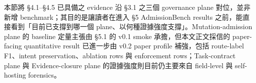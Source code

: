 \documentclass[a4paper,fontset=none]{ctexart}
\begin{document}
本節將 §4.1--§4.5 已具備之 evidence 沿 §3.1 之三個 governance plane 對位，並非新增 benchmark；其目的是讓讀者在進入 §5 AdmissionBench results 之前，能直接看到「目前已支撐到哪一個 plane、以何種證據強度支撐」。Mutation-admission plane 的 baseline 定量主張由 §5.1 的 v0.1 smoke 承擔，但本文正文採信的 paper-facing quantitative result 已進一步由 v0.2 paper profile 補強，包括 route-label F1、intent preservation、ablation rows 與 enforcement rows；Task-contract plane 與 Evidence-closure plane 的證據強度則目前仍主要來自 field-level 與 self-hosting forensics。

\smallskip{}\par\smallskip

\begingroup
\footnotesize
{}
\end{document}
